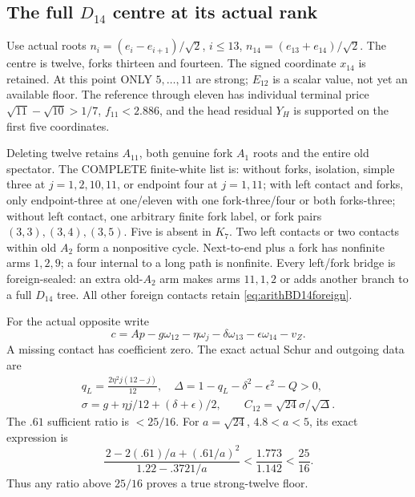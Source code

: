 \documentclass[11pt]{article}
\begin{document}
\subsection[The full D14 centre at its actual rank]{The full \(D_{14}\) centre at its actual rank}
\label{app:arithD14typedcentre}

Use actual roots
\(n_i=(e_i-e_{i+1})/\sqrt2\), \(i\le13\),
\(n_{14}=(e_{13}+e_{14})/\sqrt2\).
The centre is twelve, forks thirteen and fourteen.
The signed coordinate \(x_{14}\) is retained.
At this point ONLY \(5,\ldots,11\) are strong;
\(E_{12}\) is a scalar value, not yet an available floor.
The reference through eleven has individual terminal
price \(\sqrt{11}-\sqrt{10}>1/7\),
\(f_{11}<2.886\), and the head residual \(Y_H\)
is supported on the first five coordinates.

Deleting twelve retains \(A_{11}\), both genuine
fork \(A_1\) roots and the entire old spectator.
The COMPLETE finite-white list is:
without forks, isolation, simple three at
\(j=1,2,10,11\), or endpoint four at \(j=1,11\);
with left contact and forks, only endpoint-three
at one/eleven with one fork-three/four or both
forks-three;
without left contact, one arbitrary finite fork
label, or fork pairs \((3,3),(3,4),(3,5)\).
Five is absent in \(K_7\).
Two left contacts or two contacts within old \(A_2\)
form a nonpositive cycle.
Next-to-end plus a fork has nonfinite arms \(1,2,9\);
a four internal to a long path is nonfinite.
Every left/fork bridge is foreign-sealed:
an extra old-\(A_2\) arm makes arms \(11,1,2\)
or adds another branch to a full \(D_{14}\) tree.
All other foreign contacts retain
\eqref{eq:arithBD14foreign}.

For the actual opposite write
\[
 c=Ap-g\omega_{12}-\eta\omega_j
                   -\delta\omega_{13}-\epsilon\omega_{14}-v_Z .
\]
A missing contact has coefficient zero.
The exact actual Schur and outgoing data are
\[
 \begin{gathered}
 q_L={\frac{2\eta^2j(12-j)}{12}},\quad
 \Delta=1-q_L-\delta^2-\epsilon^2-Q>0,\\
 \sigma=g+\eta j/12+(\delta+\epsilon)/2,\qquad
 C_{12}=\sqrt{24}\sigma/\sqrt\Delta .
 \end{gathered}
\]
The \(.61\) sufficient ratio is \(<25/16\).
For \(a=\sqrt{24}\), \(4.8<a<5\), its exact
expression is
\[
 {\frac{\,2-2(.61)/a+(.61/a)^2}{1.22-.3721/a}}
                 <{\frac{1.773}{1.142}}<{\frac{25}{16}}.
\]
Thus any ratio above \(25/16\) proves a true
strong-twelve floor.
\end{document}

